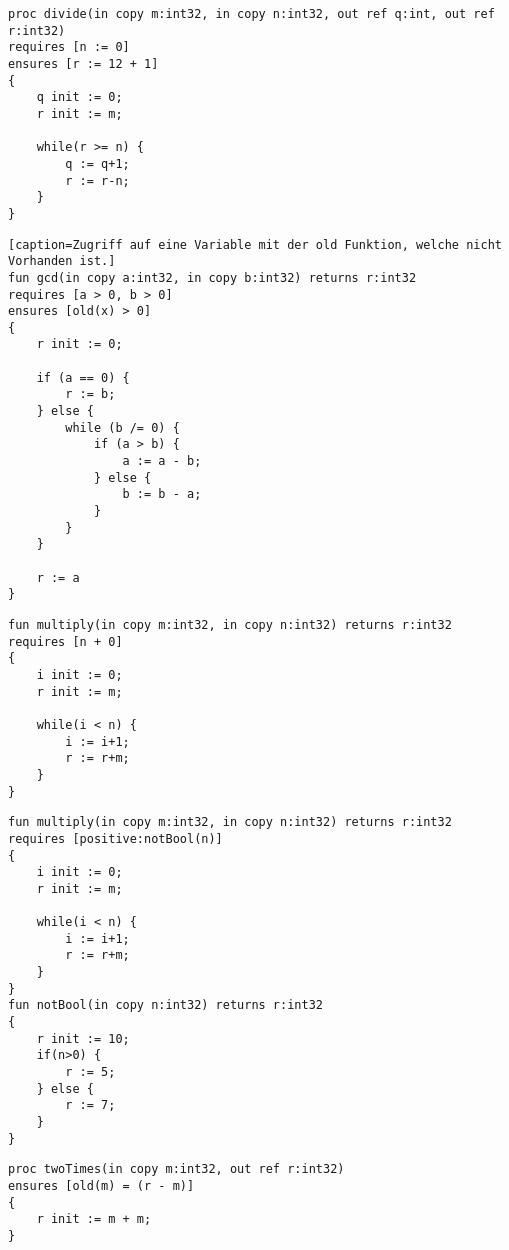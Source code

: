 
\begin{lstlisting}[caption=Wert einer Variable in der pre-/postcondition ändern]
proc divide(in copy m:int32, in copy n:int32, out ref q:int, out ref r:int32)
requires [n := 0]
ensures [r := 12 + 1]
{
    q init := 0;
    r init := m;

    while(r >= n) {
        q := q+1;
        r := r-n;
    }
}
\end{lstlisting}

\begin{lstlisting}[caption=Zugriff auf eine Variable mit der old Funktion, welche nicht Vorhanden ist.]
fun gcd(in copy a:int32, in copy b:int32) returns r:int32
requires [a > 0, b > 0]
ensures [old(x) > 0]
{
    r init := 0;
    
    if (a == 0) {
        r := b;
    } else {
        while (b /= 0) {
            if (a > b) {
                a := a - b;
            } else {
                b := b - a;
            }
        }
    }

    r := a
}
\end{lstlisting}

\begin{lstlisting}[caption=Eine nicht Boolsche Expression in der Condition List]
fun multiply(in copy m:int32, in copy n:int32) returns r:int32
requires [n + 0]
{
    i init := 0;
    r init := m;

    while(i < n) {
        i := i+1;
        r := r+m;
    }
}
\end{lstlisting}

\begin{lstlisting}[caption=Eine Funktion in der Condition List welche keinen Boolschen Wert zurückliefert]
fun multiply(in copy m:int32, in copy n:int32) returns r:int32
requires [positive:notBool(n)]
{
    i init := 0;
    r init := m;

    while(i < n) {
        i := i+1;
        r := r+m;
    }
}
fun notBool(in copy n:int32) returns r:int32
{
    r init := 10;
    if(n>0) {
        r := 5;
    } else {
        r := 7;
    }
}
\end{lstlisting}

\begin{lstlisting}[caption=????]
proc twoTimes(in copy m:int32, out ref r:int32)
ensures [old(m) = (r - m)]
{
    r init := m + m;
}
\end{lstlisting}
